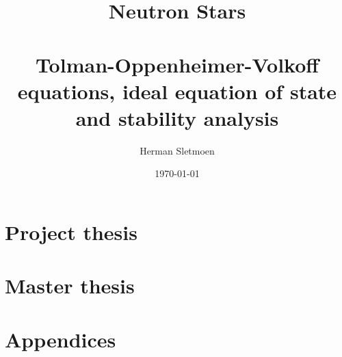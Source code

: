 \documentclass[a4paper,11pt,twoside,openany]{book}
\title{%
	Neutron Stars \\ \ \\
	\normalsize Tolman-Oppenheimer-Volkoff equations, ideal equation of state and stability analysis
}
\author{Herman Sletmoen}
\date{\today}
\newcommand{\1}{\mathds{1}}
\begin{document}
\frontmatter
\begin{titlepage}
\end{titlepage}


\tableofcontents


\mainmatter
\part{Project thesis}





\part{Master thesis}

\part{Appendices}


\backmatter
\printbibliography[heading=bibintoc, title={References}]

\cleartoevenpage %

\end{document}
